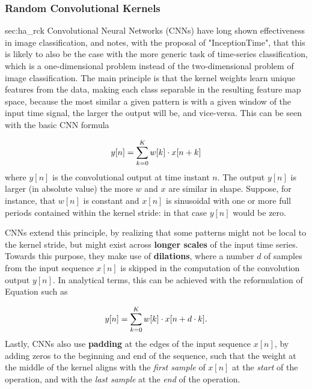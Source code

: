\subsubsection{Random Convolutional Kernels}{sec:ha_rck}
Convolutional Neural Networks (CNNs) have long shown effectiveness in image classification, and \cite{Fawaz2020} notes, with the proposal of "InceptionTime", that this is likely to also be the case with the more generic task of time-series classification, which is a one-dimensional problem instead of the two-dimensional problem of image classification.
The main principle is that the kernel weights learn unique features from the data, making each class separable in the resulting feature map space, because the most similar a given pattern is with a given window of the input time signal, the larger the output will be, and vice-versa. This can be seen with the basic CNN formula

\begin{equation}\label{eq:basic_cnn_eq}
y[n] = \sum\sb{k=0}\sp{K} w[k] \cdot x[n+k]
\end{equation}
where $y[n]$ is the convolutional output at time instant $n$. The output $y[n]$ is larger (in absolute value) the more $w$ and $x$ are similar in shape. Suppose, for instance, that $w[n]$ is constant and $x[n]$ is sinusoidal with one or more full periods contained within the kernel stride: in that case $y[n]$ would be zero.

CNNs extend this principle, by realizing that some patterns might not be local to the kernel stride, but might exist across \textbf{longer scales} of the input time series. Towards this purpose, they make use of \textbf{dilations}, where a number $d$ of samples from the input sequence $x[n]$ is skipped in the computation of the convolution
output $y[n]$. In analytical terms, this can be achieved with the reformulation of Equation \label{eq:basic_cnn_eq} such as

\begin{equation}\label{eq:dil_cnn_eq}
y[n] = \sum\sb{k=0}\sp{K} w[k] \cdot x[n+ d \cdot k].
\end{equation}
Lastly, CNNs also use \textbf{padding} at the edges of the input sequence $x[n]$, by adding zeros to the beginning and end of the sequence, such that the weight at the middle of the kernel aligns with the \emph{first sample} of $x[n]$ at the \emph{start} of the operation, and with the \emph{last sample} at the \emph{end} of the operation.

